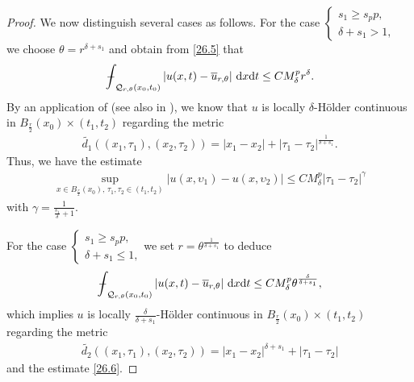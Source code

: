 \documentclass[reqno,10pt]{amsart}
\numberwithin{equation}{section}
\newcommand{ \mint }{ {\int\hspace{-0.38cm}-}}
\begin{document}
\begin{proof}
	We now distinguish several cases as follows.
	\newline
	For the case 
	$\begin{cases}
		s_1\ge s_pp,\\
		\delta+s_1>1,
	\end{cases}$ we choose $\theta=r^{\delta+s_1}$ and obtain from \eqref{26.5} that
	\begin{align*}
		\mint_{\mathcal{Q}_{r,\theta}(x_0, t_0)}\left|u(x,t)-\overline{u}_{r, \theta}\right|\,\mathrm{d}x\mathrm{d}t\le CM_\delta^pr^\delta.
	\end{align*}
	By an application of \cite[Teorema 3.I]{D65} (see also in \cite[Theorem 3.2]{G09}), we know that $u$ is locally $\delta$-H\"{o}lder continuous in $B_\frac{r}{2}(x_0)\times(t_1, t_2)$ regarding the metric
	\begin{align*}
		\tilde{d_1}((x_1, \tau_1),(x_2, \tau_2))=|x_1-x_2|+|\tau_1-\tau_2|^\frac{1}{\delta+s_1}.
	\end{align*}
	Thus, we have the estimate
	\begin{align}
		\label{26.6}
		\sup_{x\in B_{\frac{r}{2}}(x_0),\,\tau_1,\tau_2\in (t_1,t_2)}|u(x,\upsilon_1)-u(x,\upsilon_2)|\le CM^p_\delta|\tau_1-\tau_2|^\gamma
	\end{align}
	with $\gamma=\frac{1}{\frac{s_1}{\delta}+1}$.
	
	For the case $\begin{cases}
		s_1\ge s_pp,\\
		\delta+s_1\le 1,
	\end{cases}$we set $r=\theta^{\frac{1}{\delta+s_1}}$ to deduce
	\begin{align*}
		\mint_{\mathcal{Q}_{r,\theta}(x_0,t_0)}\left|u(x,t)-\overline{u}_{r,\theta}\right|\,\mathrm{d}x\mathrm{d}t\le CM^p_\delta\theta^\frac{\delta}{\delta+s_1},
	\end{align*}
	which implies $u$ is locally $\frac{\delta}{\delta+s_1}$-H\"{o}lder continuous in $B_\frac{r}{2}(x_0)\times(t_1,t_2)$ regarding the metric
	\begin{align*}
		\tilde{d_2}((x_1,\tau_1),(x_2,\tau_2))=|x_1-x_2|^{\delta+s_1}+|\tau_1-\tau_2|
	\end{align*}
	and the estimate \eqref{26.6}.
	

\end{proof}
\end{document}

